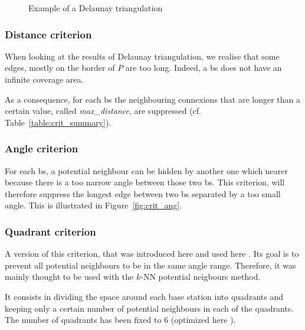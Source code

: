 \documentclass[lettersize,journal,english]{IEEEtran}
\begin{document}
\begin{figure}[!t]
    \centering
    \caption{Example of a Delaunay triangulation}
    \label{fig:crit_nei}
\end{figure}

\subsubsection{Distance criterion}
When looking at the results of Delaunay triangulation, we realise that some edges, mostly on the border of $P$ are too long. Indeed, a \acrshort{bs} does not have an infinite coverage area.

As a consequence, for each \acrshort{bs} the neighbouring connexions that are longer than a certain value, called \emph{max\_distance}, are suppressed (cf. Table~\ref{table:crit_summary}).

\subsubsection{Angle criterion}
For each \acrshort{bs}, a potential neighbour can be \og hidden\fg{} by another one which nearer because there is a too narrow angle between those two \acrshort{bs}.
This criterion, will therefore suppress the longest edge between two \acrshort{bs} separated by a too small angle. This is illustrated in Figure~\ref{fig:crit_ang}.

\subsubsection{Quadrant criterion}
A version of this criterion, that was introduced here \cite{10201211} and used here \cite{art_del_paq}. Its goal is
to prevent all potential neighbours to be in the same angle range. Therefore, it was mainly thought to be used with the 
$k$-NN potential neigbours method.

It consists in dividing the space around each base station into quadrants and keeping only a certain number of potential neighbours
in each of the quadrants. The number of quadrants has been fixed to 6 (optimized here \cite{art_del_paq}).
\end{document}
